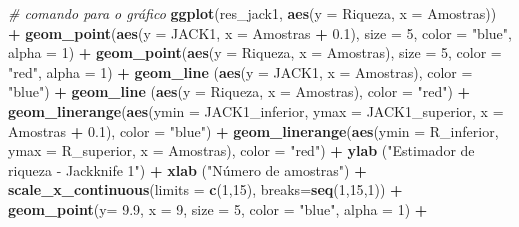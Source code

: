 \documentclass[
]{book}
\newenvironment{Shaded}{\begin{snugshade}}{\end{snugshade}}
\newcommand{\CommentTok}[1]{\textcolor[rgb]{0.56,0.35,0.01}{\textit{#1}}}
\newcommand{\DataTypeTok}[1]{\textcolor[rgb]{0.13,0.29,0.53}{#1}}
\newcommand{\DecValTok}[1]{\textcolor[rgb]{0.00,0.00,0.81}{#1}}
\newcommand{\FloatTok}[1]{\textcolor[rgb]{0.00,0.00,0.81}{#1}}
\newcommand{\KeywordTok}[1]{\textcolor[rgb]{0.13,0.29,0.53}{\textbf{#1}}}
\newcommand{\NormalTok}[1]{#1}
\newcommand{\OperatorTok}[1]{\textcolor[rgb]{0.81,0.36,0.00}{\textbf{#1}}}
\newcommand{\StringTok}[1]{\textcolor[rgb]{0.31,0.60,0.02}{#1}}
\begin{document}
\begin{Shaded}
\begin{Highlighting}[]
\CommentTok{# comando para o gráfico}
\KeywordTok{ggplot}\NormalTok{(res_jack1, }\KeywordTok{aes}\NormalTok{(}\DataTypeTok{y =}\NormalTok{ Riqueza, }\DataTypeTok{x =}\NormalTok{ Amostras)) }\OperatorTok{+}
\StringTok{  }\KeywordTok{geom_point}\NormalTok{(}\KeywordTok{aes}\NormalTok{(}\DataTypeTok{y =}\NormalTok{ JACK1, }\DataTypeTok{x =}\NormalTok{ Amostras }\OperatorTok{+}\StringTok{ }\FloatTok{0.1}\NormalTok{), }\DataTypeTok{size =} \DecValTok{5}\NormalTok{, }\DataTypeTok{color =} \StringTok{"blue"}\NormalTok{, }\DataTypeTok{alpha =} \DecValTok{1}\NormalTok{) }\OperatorTok{+}
\StringTok{  }\KeywordTok{geom_point}\NormalTok{(}\KeywordTok{aes}\NormalTok{(}\DataTypeTok{y =}\NormalTok{ Riqueza, }\DataTypeTok{x =}\NormalTok{ Amostras), }\DataTypeTok{size =} \DecValTok{5}\NormalTok{, }\DataTypeTok{color =} \StringTok{"red"}\NormalTok{, }\DataTypeTok{alpha =} \DecValTok{1}\NormalTok{) }\OperatorTok{+}
\StringTok{  }\KeywordTok{geom_line}\NormalTok{ (}\KeywordTok{aes}\NormalTok{(}\DataTypeTok{y =}\NormalTok{ JACK1, }\DataTypeTok{x =}\NormalTok{ Amostras), }\DataTypeTok{color =} \StringTok{"blue"}\NormalTok{) }\OperatorTok{+}
\StringTok{  }\KeywordTok{geom_line}\NormalTok{ (}\KeywordTok{aes}\NormalTok{(}\DataTypeTok{y =}\NormalTok{ Riqueza, }\DataTypeTok{x =}\NormalTok{ Amostras), }\DataTypeTok{color =} \StringTok{"red"}\NormalTok{) }\OperatorTok{+}
\StringTok{  }\KeywordTok{geom_linerange}\NormalTok{(}\KeywordTok{aes}\NormalTok{(}\DataTypeTok{ymin =}\NormalTok{ JACK1_inferior, }\DataTypeTok{ymax =}\NormalTok{ JACK1_superior, }\DataTypeTok{x =}\NormalTok{ Amostras }\OperatorTok{+}\StringTok{ }\FloatTok{0.1}\NormalTok{),}
 \DataTypeTok{color =} \StringTok{"blue"}\NormalTok{) }\OperatorTok{+}
\StringTok{  }\KeywordTok{geom_linerange}\NormalTok{(}\KeywordTok{aes}\NormalTok{(}\DataTypeTok{ymin =}\NormalTok{ R_inferior, }\DataTypeTok{ymax =}\NormalTok{ R_superior, }\DataTypeTok{x =}\NormalTok{ Amostras), }\DataTypeTok{color =} \StringTok{"red"}\NormalTok{) }\OperatorTok{+}
\StringTok{  }\KeywordTok{ylab}\NormalTok{ (}\StringTok{"Estimador de riqueza - Jackknife 1"}\NormalTok{) }\OperatorTok{+}
\StringTok{  }\KeywordTok{xlab}\NormalTok{ (}\StringTok{"Número de amostras"}\NormalTok{) }\OperatorTok{+}
\StringTok{  }\KeywordTok{scale_x_continuous}\NormalTok{(}\DataTypeTok{limits =} \KeywordTok{c}\NormalTok{(}\DecValTok{1}\NormalTok{,}\DecValTok{15}\NormalTok{), }\DataTypeTok{breaks=}\KeywordTok{seq}\NormalTok{(}\DecValTok{1}\NormalTok{,}\DecValTok{15}\NormalTok{,}\DecValTok{1}\NormalTok{)) }\OperatorTok{+}
\StringTok{  }\KeywordTok{geom_point}\NormalTok{(}\DataTypeTok{y=} \FloatTok{9.9}\NormalTok{, }\DataTypeTok{x =} \DecValTok{9}\NormalTok{, }\DataTypeTok{size =} \DecValTok{5}\NormalTok{, }\DataTypeTok{color =} \StringTok{"blue"}\NormalTok{, }\DataTypeTok{alpha =} \DecValTok{1}\NormalTok{) }\OperatorTok{+}\StringTok{ }

\end{Highlighting}
\end{Shaded}
\end{document}
